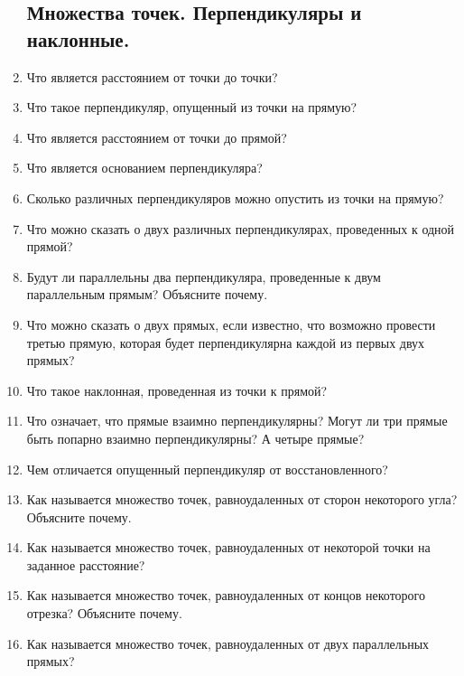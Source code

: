 \documentclass[12pt, a4paper]{article}
\begin{document}
\begin{enumerate}
	\subsection{Множества точек. Перпендикуляры и наклонные.}
	\item Что является расстоянием от точки до точки?
	\item Что такое перпендикуляр, опущенный из точки на прямую?
	\item Что является расстоянием от точки до прямой?
	\item Что является основанием перпендикуляра?
	\item Сколько различных перпендикуляров можно опустить из точки на прямую?
	\item Что можно сказать о двух различных перпендикулярах, проведенных к одной прямой?
	\item Будут ли параллельны два перпендикуляра, проведенные к двум параллельным прямым? Объясните почему.
	\item Что можно сказать о двух прямых, если известно, что возможно провести третью прямую, которая будет перпендикулярна каждой из первых двух прямых?
	\item Что такое наклонная, проведенная из точки к прямой?
	\item Что означает, что прямые взаимно перпендикулярны? Могут ли три прямые быть попарно взаимно перпендикулярны? А четыре прямые?
	\item Чем отличается опущенный перпендикуляр от восстановленного?
	\item Как называется множество точек, равноудаленных от сторон некоторого угла? Объясните почему.
	\item Как называется множество точек, равноудаленных от некоторой точки на заданное расстояние?
	\item Как называется множество точек, равноудаленных от концов некоторого отрезка? Объясните почему.
	\item Как называется множество точек, равноудаленных от двух параллельных прямых?

\end{enumerate}
\end{document}
